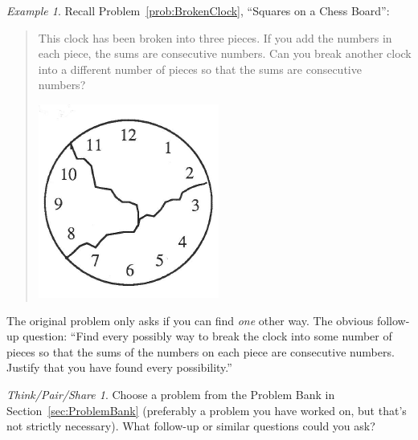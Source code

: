 \documentclass[10pt, reqno]{amsart}
\theoremstyle{remark}
\newtheorem{example}[thm]{Example}
\newtheorem*{thinkpair*}{Think/Pair/Share}
\theoremstyle{definition}
\numberwithin{equation}{section}  %
\begin{document}
\begin{example}
Recall Problem~\ref{prob:BrokenClock}, ``Squares on a Chess Board'':

\begin{quote}
 This clock has been broken into three pieces.  If you add the numbers in each piece, the sums are consecutive numbers.  Can you break another clock into a different number of pieces so that the sums are consecutive numbers?  
 \begin{center}
\includegraphics[height=3 cm]{clock}
\end{center}

\end{quote}

The original problem only asks if you can find \emph{one} other way.  The obvious follow-up question: ``Find every possibly way to break the clock into some number of pieces so that the sums of the numbers on each piece are consecutive numbers.  Justify that you have found every possibility.'' 
\end{example}


\begin{thinkpair*}
Choose a problem from the Problem Bank in Section~\ref{sec:ProblemBank} (preferably a problem you have worked on, but that's not strictly necessary).  What follow-up or similar questions could you ask?

\end{thinkpair*}
\end{document}
